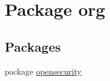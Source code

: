 \hypertarget{a00033}{\section{Package org}
\label{a00033}
}
\subsection*{Packages}
\begin{DoxyCompactItemize}
\item 
package \hyperlink{a00034}{opensecurity}
\end{DoxyCompactItemize}
